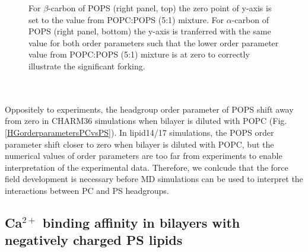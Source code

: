 \documentclass[aps,prl,superscriptaddress,twocolumn]{revtex4}
\begin{document}
\begin{figure}[]
{    For $\beta$-carbon of POPS (right panel, top) the zero point of y-axis is
    set to the value from POPC:POPS (5:1) mixture.
    For $\alpha$-carbon of POPS (right panel, bottom) the y-axis is tranferred
    with the same value for both order parameters such that the lower order
    parameter value from POPC:POPS (5:1) mixture is at zero
    to correctly illustrate the significant forking.
  }
   \\
   \\
   \\
\end{figure}

Oppositely to experiments, the headgroup order parameter of POPS shift away
from zero in CHARM36 simulations when bilayer is diluted with POPC (Fig. \ref{HGorderparametersPCvsPS}).
In lipid14/17 simulations, the POPS order parameter shift closer to zero when
bilayer is diluted with POPC, but the numerical values of order parameters
are too far from experiments to enable interpretation of the experimental data.
Therefore, we conlcude that the force field development is necessary before
MD simulations can be used to interpret the interactions between PC and PS headgroups.



\subsection{Ca$^{2+}$ binding affinity in bilayers with negatively charged PS lipids}
\end{document}
